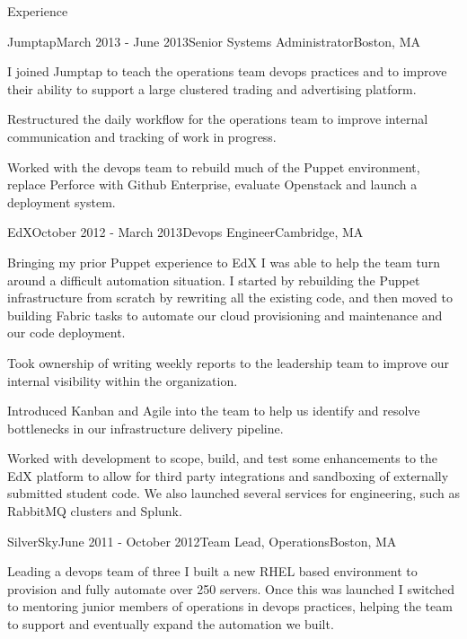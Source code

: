 \documentclass{resume} %
\begin{document}
\begin{rSection}{Experience}
\begin{rSubsection}{Jumptap}{March 2013 - June 2013}{Senior Systems Administrator}{Boston, MA}
\item[] I joined Jumptap to teach the operations team devops practices and to improve their ability to support a large
clustered trading and advertising platform.

\item Restructured the daily workflow for the operations team to improve internal communication and tracking of work in progress.
\item Worked with the devops team to rebuild much of the Puppet environment, replace Perforce with Github Enterprise, evaluate Openstack and launch a deployment system.
\end{rSubsection}


\begin{rSubsection}{EdX}{October 2012 - March 2013}{Devops Engineer}{Cambridge, MA}
\item[] Bringing my prior Puppet experience to EdX I was able to help the team turn around a difficult automation situation.  I started by rebuilding the Puppet infrastructure from scratch by rewriting all the existing code, and then moved to building Fabric tasks to automate our cloud provisioning and maintenance and our code deployment.

\item Took ownership of writing weekly reports to the leadership team to improve our internal visibility within the organization.
\item Introduced Kanban and Agile into the team to help us identify and resolve bottlenecks in our infrastructure delivery pipeline.
\item Worked with development to scope, build, and test some enhancements to the EdX platform to allow for third party integrations and sandboxing of externally submitted student code.  We also launched several services for engineering, such as RabbitMQ clusters and Splunk.
\end{rSubsection}

\begin{rSubsection}{SilverSky}{June 2011 - October 2012}{Team Lead, Operations}{Boston, MA}
\item[] Leading a devops team of three I built a new RHEL based environment to provision and fully automate over 250 servers.  Once this was launched I switched to mentoring junior members of operations in devops practices, helping the team to support and eventually expand the automation we built.


\end{rSubsection}
\end{rSection}
\end{document}
